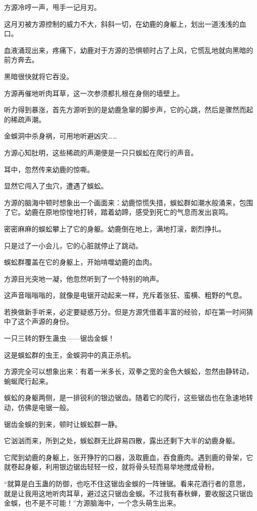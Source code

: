 \begin{this_body}
方源冷哼一声，甩手一记月刃。

这月刃被方源控制的威力不大，斜斜一切，在幼鹿的身躯上，划出一道浅浅的血口。

血液涌现出来，疼痛下，幼鹿对于方源的恐惧顿时占了上风，它慌乱地就向黑暗的前方奔去。

黑暗很快就将它吞没。

方源再催地听肉耳草，这一次参须都扎根在身侧的墙壁上。

听力得到暴涨，首先方源听到的是幼鹿急窜的脚步声，它的心跳，然后是骤然而起的稀疏声潮。

金蜈洞中杀身祸，可用地听避凶灾……

方源心知肚明，这些稀疏的声潮便是一只只蜈蚣在爬行的声音。

耳中，忽然传来幼鹿的惊嘶。

显然它闯入了虫穴，遭遇了蜈蚣。

方源的脑海中顿时想象出一个画面来：幼鹿惊慌失措，蜈蚣群如潮水般涌来，包围了它。幼鹿在原地惊惶地打转，踏着幼蹄，感受到死亡的气息而发出哀鸣。

密密麻麻的蜈蚣攀上了它的身躯。幼鹿倒在地上，满地打滚，剧烈挣扎。

只是过了一小会儿，它的心脏就停止了跳动。

蜈蚣群覆盖在它的身躯上，开始啃噬幼鹿的血肉。

方源目光突地一凝，他忽然听到了一个特别的响声。

这声音嗡嗡嗡的，就像是电锯开动起来一样，充斥着张狂、蛮横、粗野的气息。

若换做新手听来，必定要疑惑万分。但是方源凭借着丰富的经验，却在第一时间猜中了这个声源的身份。

一只三转的野生蛊虫——锯齿金蜈！

这是蜈蚣群的虫王，金蜈洞中的真正杀机。

方源完全可以想象出来：有着一米多长，双拳之宽的金色大蜈蚣，忽然由静转动，蜿蜒爬行起来。

蜈蚣的身躯两侧，是一排锐利的银边锯齿。随着它的爬行，这些锯齿也在急速地转动，仿佛是电锯一般。

锯齿金蜈的到来，顿时让蜈蚣群一静。

它汹汹而来，所到之处，蜈蚣群无比辟易四散，露出还剩下大半的幼鹿身躯。

它爬到幼鹿的身躯上，张开狰狞的口器，汲取鹿血，吞食鹿肉。遇到鹿的骨架，它就卷起身躯，利用银边锯齿轻轻一绞，就将骨头轻而易举地搅成骨粉。

“就算是白玉蛊的防御，也吃不住这锯齿金蜈的一阵锉锯。看来花酒行者的意思，就是让我用这地听肉耳草，避过这只锯齿金蜈。不过我有春秋蝉，要收服这只锯齿金蜈，也不是不可能！”方源脑海中，一个念头萌生出来。


\end{this_body}
